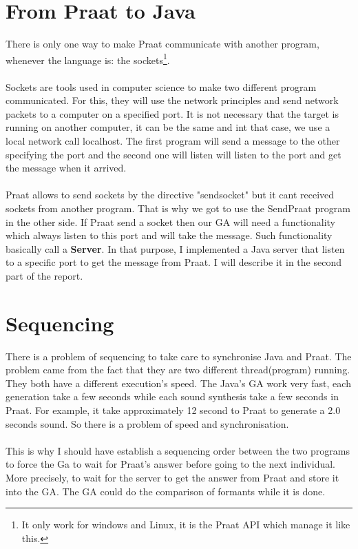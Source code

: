 \documentclass[12pt]{report}
\begin{document}
\section{From Praat to Java}
There is only one way to make Praat communicate with another program, whenever the language is: the sockets\footnote{It only work for windows and Linux, it is the Praat API which manage it like this.}. 

\paragraph*{}
Sockets are tools used in computer science to make two different program communicated. For this, they will use the network principles and send network packets to a computer on a specified port. It is not necessary that the target is running on another computer, it can be the same and int that case, we use a local network call localhost. The first program will send a message to the other specifying the port and the second one will listen will listen to the port and get the message when it arrived.

\paragraph*{}
Praat allows to send sockets by the directive "sendsocket" but it cant received sockets from another program. That is why we got to use the SendPraat program in the other side.
If Praat send a socket then our GA will need a functionality which always listen to this port and  will take the message. Such functionality basically call a {\bfseries Server}.
In that purpose, I implemented a Java server that listen to a specific port to get the message from Praat. I will describe it in the second part of the report.

\section{Sequencing}
There is a problem of sequencing to take care to synchronise Java and Praat. The problem came from the fact that they are two different thread(program) running.
They both have a different execution's speed. The Java's GA work very fast, each generation take a few seconds while each sound synthesis take a few seconds in Praat. For example, it take approximately 12 second to Praat to generate a 2.0 seconds sound. So there is a problem of speed and synchronisation.

\paragraph*{}
This is why I should have establish a sequencing order between the two programs to force the Ga to wait for Praat's answer before going to the next individual. More precisely, to wait for the server to get the answer from Praat and store it into the GA. The GA could do the comparison of formants while it is done.
\end{document}
